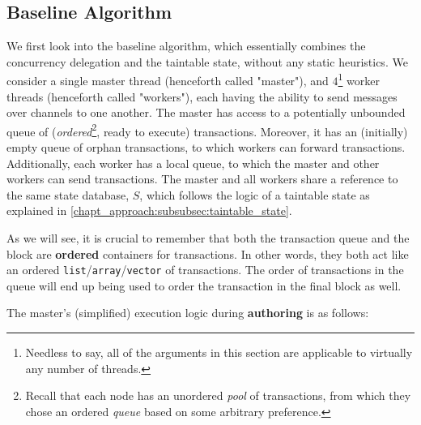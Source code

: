\subsection{Baseline Algorithm} \label{subsec:baseline_alg}

We first look into the baseline algorithm, which essentially combines the concurrency delegation and
the taintable state, without any static heuristics. We consider a single master thread (henceforth
called "master"), and $4$\footnote{Needless to say, all of the arguments in this section are
applicable to virtually any number of threads.} worker threads (henceforth called "workers"), each
having the ability to send messages over channels to one another. The master has access to a
potentially unbounded queue of (\textit{ordered}\footnote{Recall that each node has an unordered
\textit{pool} of transactions, from which they chose an ordered \textit{queue} based on some
arbitrary preference.}, ready to execute) transactions. Moreover, it has an (initially) empty queue
of orphan transactions, to which workers can forward transactions. Additionally, each worker has a
local queue, to which the master and other workers can send transactions. The master and all workers
share a reference to the same state database, $S$, which follows the logic of a taintable state as
explained in \ref{chapt_approach:subsubsec:taintable_state}.

\begin{remark}
    As we will see, it is crucial to remember that both the transaction queue and the block are
    \textbf{ordered} containers for transactions. In other words, they both act like an ordered
    \texttt{list}/\texttt{array}/\texttt{vector} of transactions. The order of transactions in the
    queue will end up being used to order the transaction in the final block as well.
\end{remark}

The master's (simplified) execution logic during \textbf{authoring} is as follows:

